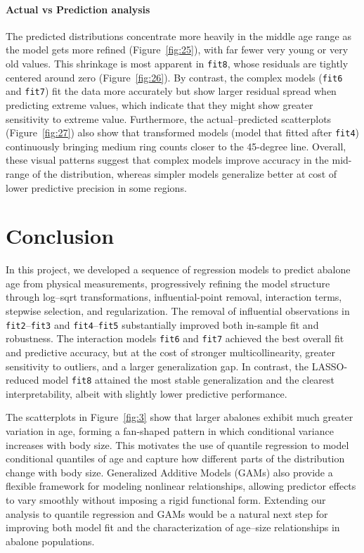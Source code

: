 \documentclass[12pt]{article}
\begin{document}
	\paragraph{Actual vs Prediction analysis}
	The predicted distributions concentrate more heavily in the middle age range as the model gets more refined (Figure~\ref{fig:25}), with far fewer very young or very old values. This shrinkage is most apparent in \texttt{fit8}, whose residuals are tightly centered around zero 
	(Figure~\ref{fig:26}). By contrast, the complex models (\texttt{fit6} and \texttt{fit7}) fit the data more accurately but show larger residual spread when predicting extreme values, which indicate that they might show greater sensitivity to extreme value. Furthermore, the actual–predicted scatterplots (Figure~\ref{fig:27}) also show that transformed models (model that fitted after \texttt{fit4}) continuously bringing medium ring counts closer to the 45-degree line. Overall, these visual patterns suggest that complex models improve accuracy in the mid-range of the distribution, whereas simpler models generalize better at cost of lower predictive precision in some regions.
	
	
	\section*{Conclusion}
  In this project, we developed a sequence of regression models to predict abalone age from physical measurements, progressively refining the model structure through log–sqrt transformations, influential-point removal, interaction terms, stepwise selection, and regularization. The removal of influential observations in \texttt{fit2}–\texttt{fit3} and \texttt{fit4}–\texttt{fit5} substantially improved both in-sample fit and robustness. The interaction models \texttt{fit6} and \texttt{fit7} achieved the best overall fit and predictive accuracy, but at the cost of stronger multicollinearity, greater sensitivity to outliers, and a larger generalization gap. In contrast, the LASSO-reduced model \texttt{fit8} attained the most stable generalization and the clearest interpretability, albeit with slightly lower predictive performance.
  
  The scatterplots in Figure~\ref{fig:3} show that larger abalones exhibit much greater variation in age, forming a fan-shaped pattern in which conditional variance increases with body size. This motivates the use of quantile regression \citep{koenker1978quantile} to model conditional quantiles of age and capture how different parts of the distribution change with body size. Generalized Additive Models (GAMs) \citep{hastie1990gam} also provide a flexible framework for modeling nonlinear relationships, allowing predictor effects to vary smoothly without imposing a rigid functional form. Extending our analysis to quantile regression and GAMs would be a natural next step for improving both model fit and the characterization of age–size relationships in abalone populations.
	
\end{document}
